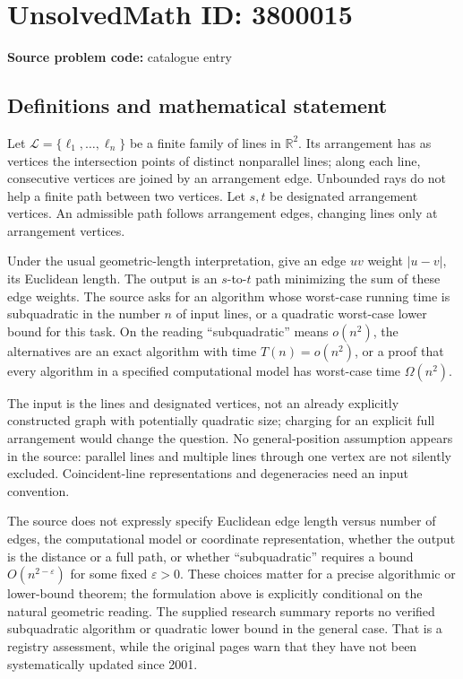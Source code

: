 \documentclass[11pt]{article}
\begin{document}
\section*{UnsolvedMath ID: 3800015}
\textbf{Source problem code:} catalogue entry
\subsection{Definitions and mathematical statement}
Let \(\mathcal L=\{\ell_1,\ldots,\ell_n\}\) be a finite family of lines in \(\mathbb R^2\). Its arrangement has as vertices the intersection points of distinct nonparallel lines; along each line, consecutive vertices are joined by an arrangement edge. Unbounded rays do not help a finite path between two vertices. Let \(s,t\) be designated arrangement vertices. An admissible path follows arrangement edges, changing lines only at arrangement vertices.

Under the usual geometric-length interpretation, give an edge \(uv\) weight \(|u-v|\), its Euclidean length. The output is an \(s\)-to-\(t\) path minimizing the sum of these edge weights. The source asks for an algorithm whose worst-case running time is subquadratic in the number \(n\) of input lines, or a quadratic worst-case lower bound for this task. On the reading ``subquadratic'' means \(o(n^2)\), the alternatives are an exact algorithm with time \(T(n)=o(n^2)\), or a proof that every algorithm in a specified computational model has worst-case time \(\Omega(n^2)\).

The input is the lines and designated vertices, not an already explicitly constructed graph with potentially quadratic size; charging for an explicit full arrangement would change the question. No general-position assumption appears in the source: parallel lines and multiple lines through one vertex are not silently excluded. Coincident-line representations and degeneracies need an input convention.

The source does not expressly specify Euclidean edge length versus number of edges, the computational model or coordinate representation, whether the output is the distance or a full path, or whether ``subquadratic'' requires a bound \(O(n^{2-\varepsilon})\) for some fixed \(\varepsilon>0\). These choices matter for a precise algorithmic or lower-bound theorem; the formulation above is explicitly conditional on the natural geometric reading. The supplied research summary reports no verified subquadratic algorithm or quadratic lower bound in the general case. That is a registry assessment, while the original pages warn that they have not been systematically updated since 2001.
\end{document}
